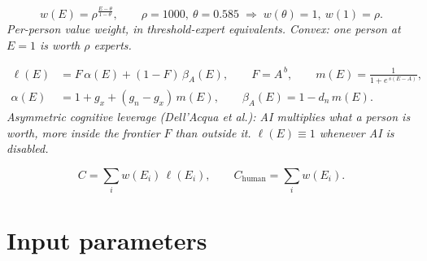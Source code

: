 \documentclass[11pt]{article}
\newcommand{\eqnote}[1]{{\small\itshape #1}\par\addvspace{4pt}}
\begin{document}
\begin{equation}\label{eq:E18}
  w(E) = \rho^{\frac{E - \theta}{1 - \theta}}, \qquad
  \rho = 1000,\ \theta = 0.585
  \;\Longrightarrow\; w(\theta) = 1,\ w(1) = \rho .
\end{equation}
\eqnote{Per-person value weight, in threshold-expert equivalents. Convex: one
person at $E = 1$ is worth $\rho$ experts.}

\begin{equation}\label{eq:E19}
  \begin{aligned}
    \ell(E) &= F\,\alpha(E) + (1 - F)\,\beta_A(E), \qquad
              F = A^{\,b}, \qquad
              m(E) = \frac{1}{1 + e^{\,s(E - A)}},\\[2pt]
    \alpha(E) &= 1 + g_x + (g_n - g_x)\,m(E), \qquad
    \beta_A(E) = 1 - d_n\,m(E).
  \end{aligned}
\end{equation}
\eqnote{Asymmetric cognitive leverage (Dell'Acqua et al.): AI multiplies what a
person is worth, more inside the frontier $F$ than outside it. $\ell(E) \equiv 1$
whenever AI is disabled.}

\begin{equation}\label{eq:E20}
  C = \sum_i w(E_i)\,\ell(E_i), \qquad
  C_{\text{human}} = \sum_i w(E_i).
\end{equation}

\section{Input parameters}
\end{document}
